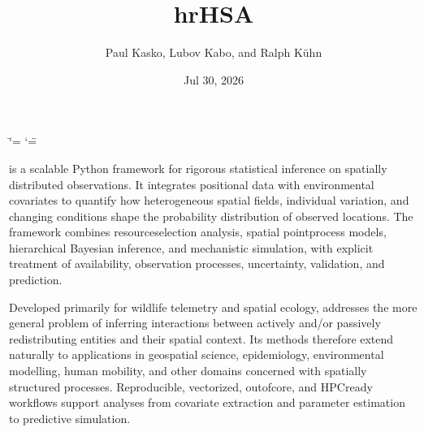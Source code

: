 \documentclass[letterpaper,10pt,english]{sphinxmanual}
\title{hrHSA}
\date{Jul 30, 2026}
\author{Paul Kasko, Lubov Kabo, and Ralph Kühn}
\begin{document}
\ifdefined\shorthandoff
  \ifnum\catcode`\=\string=\active\shorthandoff{=}\fi
  \ifnum\catcode`\"=\active{}\fi
\fi

\pagestyle{empty}
\sphinxmaketitle
\pagestyle{plain}
\sphinxtableofcontents
\pagestyle{normal}
\label{\detokenize{index::doc}}


\sphinxAtStartPar
{}  is a scalable Python framework for rigorous statistical inference on spatially distributed observations. It integrates positional data with environmental covariates to quantify how heterogeneous spatial fields, individual variation, and changing conditions shape the probability distribution of observed locations. The framework combines resource\sphinxhyphen{}selection analysis, spatial point\sphinxhyphen{}process models, hierarchical Bayesian inference, and mechanistic simulation, with explicit treatment of availability, observation processes, uncertainty, validation, and prediction.

\sphinxAtStartPar
Developed primarily for wildlife telemetry and spatial ecology,  addresses the more general problem of inferring interactions between actively and/or passively redistributing entities and their spatial context. Its methods therefore extend naturally to applications in geospatial science, epidemiology, environmental modelling, human mobility, and other domains concerned with spatially structured processes. Reproducible, vectorized, out\sphinxhyphen{}of\sphinxhyphen{}core, and HPC\sphinxhyphen{}ready workflows support analyses from covariate extraction and parameter estimation to predictive simulation.

\sphinxstepscope
\end{document}
